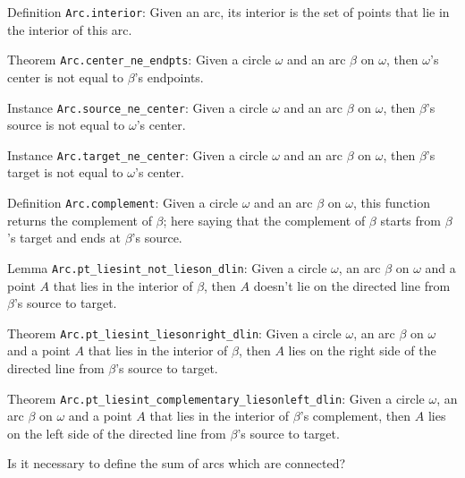 \documentclass[12pt]{amsart}
\begin{document}
\begin{itemize}
    \item Definition \verb|Arc.interior|: Given an arc, its interior is the set of points that lie in the interior of this arc.
    \item Theorem \verb|Arc.center_ne_endpts|: Given a circle $\omega$ and an arc $\beta$ on $\omega$, then $\omega$'s center is not equal to $\beta$'s endpoints.
    \item Instance \verb|Arc.source_ne_center|: Given a circle $\omega$ and an arc $\beta$ on $\omega$, then $\beta$'s source is not equal to $\omega$'s center.
    \item Instance \verb|Arc.target_ne_center|: Given a circle $\omega$ and an arc $\beta$ on $\omega$, then $\beta$'s target is not equal to $\omega$'s center.
    \item Definition \verb|Arc.complement|: Given a circle $\omega$ and an arc $\beta$ on $\omega$, this function returns the complement of $\beta$; here saying that the complement of $\beta$ starts from $\beta$'s target and ends at $\beta$'s source.
    \item Lemma \verb|Arc.pt_liesint_not_lieson_dlin|: Given a circle $\omega$, an arc $\beta$ on $\omega$ and a point $A$ that lies in the interior of $\beta$, then $A$ doesn't lie on the directed line from $\beta$'s source to target.
    \item Theorem \verb|Arc.pt_liesint_liesonright_dlin|: Given a circle $\omega$, an arc $\beta$ on $\omega$ and a point $A$ that lies in the interior of $\beta$, then $A$ lies on the right side of the directed line from $\beta$'s source to target.
    \item Theorem \verb|Arc.pt_liesint_complementary_liesonleft_dlin|: Given a circle $\omega$, an arc $\beta$ on $\omega$ and a point $A$ that lies in the interior of $\beta$'s complement, then $A$ lies on the left side of the directed line from $\beta$'s source to target.
    {\color{red} \item Is it necessary to define the sum of arcs which are connected?}
\end{itemize}
\end{document}
